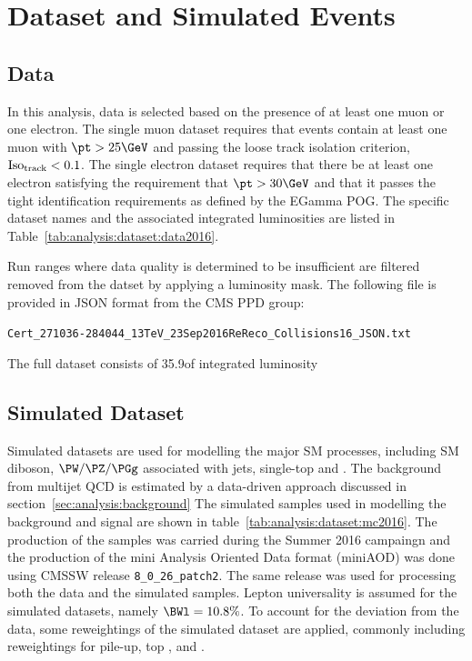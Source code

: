 \section{Dataset and Simulated Events}
\label{sec:analysis:dataset}


\subsection{Data}
\label{sec:analysis:dataset:data}

In this analysis, data is selected based on the presence of at least one muon or one electron. The single muon dataset requires that events contain at least one muon with $\pt > 25\GeV$ and passing the loose track isolation criterion, $\rm Iso_{track} < 0.1$. The single electron dataset requires that there be at least one electron satisfying the requirement that $\pt > 30\GeV$ and that it passes the tight identification requirements as defined by the EGamma POG.  The specific dataset names and the associated integrated luminosities are listed in Table~\ref{tab:analysis:dataset:data2016}.



\noindent Run ranges where data quality is determined to be insufficient are filtered removed from the datset by applying a luminosity mask. The following file is provided in JSON format from the CMS PPD group:

\texttt{Cert\_271036-284044\_13TeV\_23Sep2016ReReco\_Collisions16\_JSON.txt}

\noindent The full dataset consists of 35.9\fbinv of integrated luminosity~\cite{cms:lumi2016:CMS-PAS-LUM-17-001}




\subsection{Simulated Dataset}
\label{sec:analysis:dataset:simulation}

Simulated datasets are used for modelling the major SM processes, including SM diboson, $\PW/\PZ/\PGg$ associated with jets, single-top and \ttbar. The background from multijet QCD is estimated by a data-driven approach discussed in section~\ref{sec:analysis:background} The simulated samples used in modelling the background and signal are shown in table~\ref{tab:analysis:dataset:mc2016}.  The production of the samples was carried during the Summer 2016 campaingn and the production of the mini Analysis Oriented Data format (miniAOD) was done using CMSSW release \texttt{8\_0\_26\_patch2}. The same release was used for processing both the data and the simulated samples. Lepton universality is assumed for the simulated datasets, namely $ \BWl = 10.8\%$. To account for the deviation from the data, some reweightings of the simulated dataset are applied, commonly including reweightings for pile-up, top \pt, \WW \pt and \PZ \pt.

